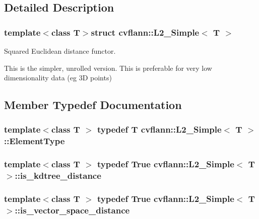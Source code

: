 \subsection{Detailed Description}
\subsubsection*{template$<$class T$>$struct cvflann\-::\-L2\-\_\-\-Simple$<$ T $>$}

Squared Euclidean distance functor.

This is the simpler, unrolled version. This is preferable for very low dimensionality data (eg 3\-D points) 

\subsection{Member Typedef Documentation}
\hypertarget{structcvflann_1_1L2__Simple_a670b89d34d56ea8dad5b4c723c19347b}{
\subsubsection[{Element\-Type}]{\setlength{\rightskip}{0pt plus 5cm}template$<$class T $>$ typedef {\bf T} {\bf cvflann\-::\-L2\-\_\-\-Simple}$<$ {\bf T} $>$\-::{\bf Element\-Type}}}\label{structcvflann_1_1L2__Simple_a670b89d34d56ea8dad5b4c723c19347b}
\hypertarget{structcvflann_1_1L2__Simple_a31398f63f04c3eacf258fc9f79713a36}{
\subsubsection[{is\-\_\-kdtree\-\_\-distance}]{\setlength{\rightskip}{0pt plus 5cm}template$<$class T $>$ typedef {\bf True} {\bf cvflann\-::\-L2\-\_\-\-Simple}$<$ {\bf T} $>$\-::{\bf is\-\_\-kdtree\-\_\-distance}}}\label{structcvflann_1_1L2__Simple_a31398f63f04c3eacf258fc9f79713a36}
\hypertarget{structcvflann_1_1L2__Simple_acbe5d8b162c1e137bebd06ddb1c24584}{
\subsubsection[{is\-\_\-vector\-\_\-space\-\_\-distance}]{\setlength{\rightskip}{0pt plus 5cm}template$<$class T $>$ typedef {\bf True} {\bf cvflann\-::\-L2\-\_\-\-Simple}$<$ {\bf T} $>$\-::{\bf is\-\_\-vector\-\_\-space\-\_\-distance}}}\label{structcvflann_1_1L2__Simple_acbe5d8b162c1e137bebd06ddb1c24584}
